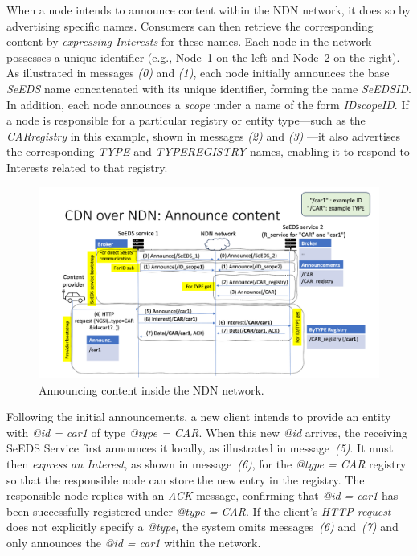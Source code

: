 \documentclass{article}
\begin{document}
When a node intends to announce content within the NDN network, it does so by advertising specific names. Consumers can then retrieve the corresponding content by \emph{expressing Interests} for these names. Each node in the network possesses a unique identifier (e.g., Node~1 on the left and Node~2 on the right). As illustrated in messages \emph{(0)} and \emph{(1)}, each node initially announces the base \textit{SeEDS} name concatenated with its unique identifier, forming the name \textit{SeEDS\textunderscore ID}. In addition, each node announces a \emph{scope} under a name of the form \textit{ID\textunderscore scopeID}. If a node is responsible for a particular registry or entity type—such as the \textit{CAR\textunderscore registry} in this example, shown in messages \emph{(2)} and \emph{(3)} —it also advertises the corresponding \textit{TYPE} and \textit{TYPE\textunderscore REGISTRY} names, enabling it to respond to Interests related to that registry.

\begin{figure}[H]
    \centering
    \includegraphics[width=0.8\linewidth]{images/announce_content.png}
    \caption{Announcing content inside the NDN network.}
    \label{fig:annoucing_content}
\end{figure}

Following the initial announcements, a new client intends to provide an entity with \textit{@id = car1} of type \textit{@type = CAR}. When this new \textit{@id} arrives, the receiving SeEDS Service first announces it locally, as illustrated in message~\emph{(5)}. It must then \emph{express an Interest}, as shown in message~\emph{(6)}, for the \textit{@type = CAR} registry so that the responsible node can store the new entry in the registry. The responsible node replies with an \emph{ACK} message, confirming that \textit{@id = car1} has been successfully registered under \textit{@type = CAR}. If the client’s \emph{HTTP request} does not explicitly specify a \textit{@type}, the system omits messages~\emph{(6)} and~\emph{(7)} and only announces the \textit{@id = car1} within the network.
\end{document}
